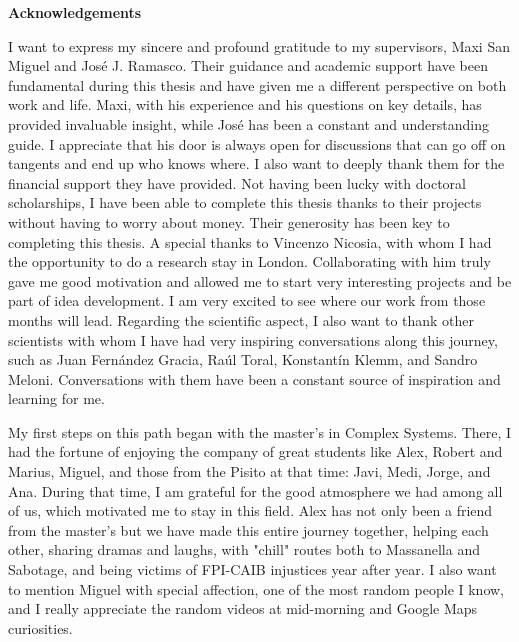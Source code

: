 \pagebreak
\frontmatter
\thispagestyle{empty}
{}
\textbf{ \huge Acknowledgements}

\vspace*{0.5 cm}

I want to express my sincere and profound gratitude to my supervisors, Maxi San Miguel and José J. Ramasco. Their guidance and academic support have been fundamental during this thesis and have given me a different perspective on both work and life. Maxi, with his experience and his questions on key details, has provided invaluable insight, while José has been a constant and understanding guide. I appreciate that his door is always open for discussions that can go off on tangents and end up who knows where. I also want to deeply thank them for the financial support they have provided. Not having been lucky with doctoral scholarships, I have been able to complete this thesis thanks to their projects without having to worry about money. Their generosity has been key to completing this thesis. A special thanks to Vincenzo Nicosia, with whom I had the opportunity to do a research stay in London. Collaborating with him truly gave me good motivation and allowed me to start very interesting projects and be part of idea development. I am very excited to see where our work from those months will lead. Regarding the scientific aspect, I also want to thank other scientists with whom I have had very inspiring conversations along this journey, such as Juan Fernández Gracia, Raúl Toral, Konstantín Klemm, and Sandro Meloni. Conversations with them have been a constant source of inspiration and learning for me.

My first steps on this path began with the master's in Complex Systems. There, I had the fortune of enjoying the company of great students like Alex, Robert and Marius, Miguel, and those from the Pisito at that time: Javi, Medi, Jorge, and Ana. During that time, I am grateful for the good atmosphere we had among all of us, which motivated me to stay in this field. Alex has not only been a friend from the master's but we have made this entire journey together, helping each other, sharing dramas and laughs, with "chill" routes both to Massanella and Sabotage, and being victims of FPI-CAIB injustices year after year. I also want to mention Miguel with special affection, one of the most random people I know, and I really appreciate the random videos at mid-morning and Google Maps curiosities.

